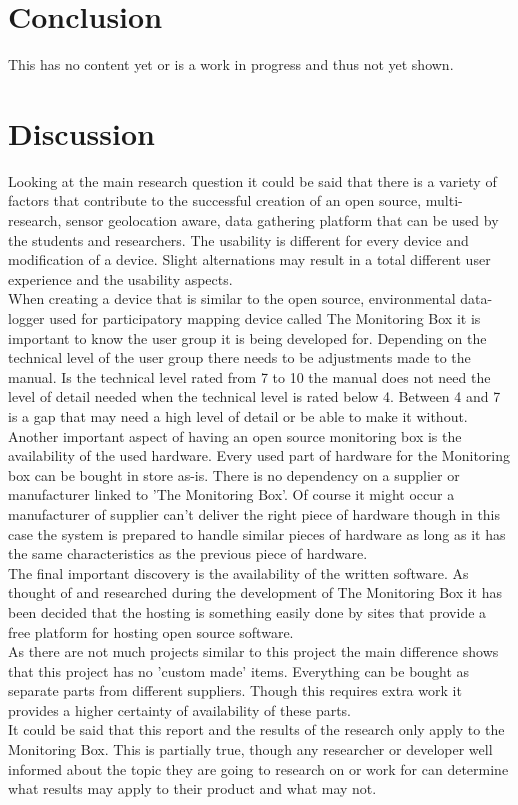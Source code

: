 \documentclass[conference]{IEEEtran}
\begin{document}
\section{Conclusion}
	This has no content yet or is a work in progress and thus not yet shown.

\section{Discussion}
	Looking at the main research question it could be said that there is a variety of factors that contribute to the successful creation of an open source, multi-research, sensor geolocation aware, data gathering platform that can be used by the students and researchers. The usability is different for every device and modification of a device. Slight alternations may result in a total different user experience and the usability aspects. \\
	When creating a device that is similar to the open source, environmental data-logger used for participatory mapping device called The Monitoring Box it is important to know the user group it is being developed for. Depending on the technical level of the user group there needs to be adjustments made to the manual. Is the technical level rated from 7 to 10 the manual does not need the level of detail needed when the technical level is rated below 4. Between 4 and 7 is a gap that may need a high level of detail or be able to make it without.\\
	Another important aspect of having an open source monitoring box is the availability of the used hardware. Every used part of hardware for the Monitoring box can be bought in store as-is. There is no dependency on a supplier or manufacturer linked to 'The Monitoring Box'. Of course it might occur a manufacturer of supplier can't deliver the right piece of hardware though in this case the system is prepared to handle similar pieces of hardware as long as it has the same characteristics as the previous piece of hardware. \\
	The final important discovery is the availability of the written software. As thought of and researched during the development of The Monitoring Box it has been decided that the hosting is something easily done by sites that provide a free platform for hosting open source software.\\	
	As there are not much projects similar to this project the main difference shows that this project has no 'custom made' items. Everything can be bought as separate parts from different suppliers. Though this requires extra work it provides a higher certainty of availability of these parts. \\
	It could be said that this report and the results of the research only apply to the Monitoring Box. This is partially true, though any researcher or developer well informed about the topic they are going to research on or work for can determine what results may apply to their product and what may not.
\end{document}
